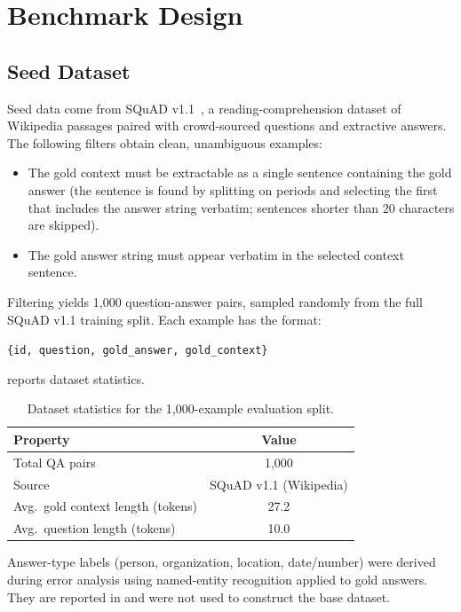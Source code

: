 \documentclass[11pt]{article}
\begin{document}
\section{Benchmark Design}
\label{sec:benchmark}

\subsection{Seed Dataset}

Seed data come from SQuAD v1.1~\cite{rajpurkar2016squad}, a reading-comprehension
dataset of Wikipedia passages paired with crowd-sourced questions and extractive answers.
The following filters obtain clean, unambiguous examples:

\begin{itemize}[noitemsep]
  \item The gold context must be extractable as a single sentence containing the gold answer
        (the sentence is found by splitting on periods and selecting the first that
        includes the answer string verbatim; sentences shorter than 20 characters are skipped).
  \item The gold answer string must appear verbatim in the selected context sentence.
\end{itemize}

Filtering yields 1{,}000 question-answer pairs, sampled randomly from the full SQuAD
v1.1 training split. Each example has the format:
\begin{center}
\texttt{\{id, question, gold\_answer, gold\_context\}}
\end{center}
 reports dataset statistics.

\begin{table}[htbp]
\centering
\caption{Dataset statistics for the 1{,}000-example evaluation split.}
\label{tab:dataset-stats}
\begin{tabular}{lc}
\toprule
\textbf{Property} & \textbf{Value} \\
\midrule
Total QA pairs                     & 1{,}000 \\
Source                             & SQuAD v1.1 (Wikipedia) \\
Avg.\ gold context length (tokens) & 27.2 \\
Avg.\ question length (tokens)     & 10.0 \\
\bottomrule
\end{tabular}
\end{table}

Answer-type labels (person, organization, location, date/number) were derived during
error analysis using named-entity recognition applied to gold answers. They are reported
in  and were not used to construct the base dataset.
\end{document}
